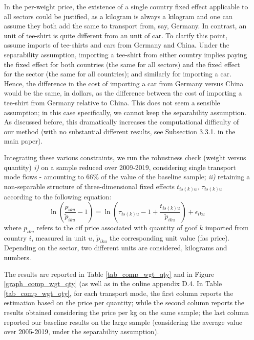 \documentclass[a4paper,11pt]{article}
\begin{document}
In the per-weight price, the existence of a single country fixed effect applicable to all sectors could be justified, as a kilogram is always a kilogram and one can assume they both add the same to transport from, say, Germany. In contrast, an unit of tee-shirt is quite different from an unit of car. To clarify this point, assume imports of tee-shirts and cars from Germany and China. Under the separability assumption, importing a tee-shirt from either country implies paying the fixed effect for both countries (the same for all sectors) and the fixed effect for the sector (the same for all countries); and similarly for importing a car. Hence, the difference in the cost of importing a car from Germany versus China would be the same, in dollars, as the difference between the cost of importing a tee-shirt from Germany relative to China. This does not seem a sensible assumption; in this case specifically, we cannot keep the separability assumption.
As discussed before, this dramatically increases the computational difficulty of our method (with no substantial different results, see Subsection 3.3.1. in the main paper).\smallskip

Integrating these various constraints, we run the robustness check (weight versus quantity) \textit{i)} on a sample reduced over 2009-2019, considering single transport mode flows - amounting to 66\% of the value of the baseline sample; \textit{ii)} retaining a non-separable structure of three-dimensional fixed effects $t_{is(k)u}$, $\tau_{is(k)u}$ according to the following equation:
\begin{equation*}
\ln\left(\frac{p_{iku}}{\widetilde{p}_{iku}}-1 \right)= \ln \left(\tau_{is(k)u} -1+\frac{t_{is(k)u} }{\widetilde{p}_{iku}} \right) + \epsilon_{iku}
\end{equation*}
\noindent where $p_{iku}$ refers to the cif price associated with quantity of goof $k$ imported from country $i$, measured in unit $u$, $\widetilde{p}_{iku}$ the corresponding unit value (fas price). Depending on the sector, two different units are considered, kilograms and numbers.

The results are reported in Table \ref{tab_comp_wgt_qty} and in Figure \ref{graph_comp_wgt_qty} (as well as in the online appendix D.4. In Table \ref{tab_comp_wgt_qty}, for each transport mode, the first column reports the estimation based on the price per quantity; while the second column reports the results obtained considering the price per kg on the same sample; the last column reported our baseline results on the large sample (considering the average value over 2005-2019, under the separability assumption).
\end{document}
